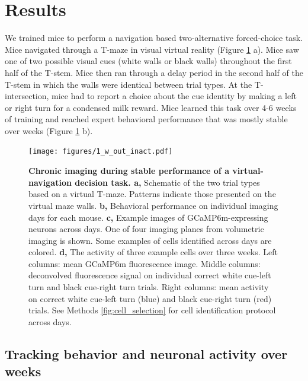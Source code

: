 \section{Results} \label{sec:chap3_results}

We trained mice to perform a navigation based two-alternative forced-choice task. Mice navigated through a T-maze in visual virtual reality  \citep{Harvey:2012du} (Figure \ref{fig:1_w_out_inact} a). Mice saw one of two possible visual cues (white walls or black walls) throughout the first half of the T-stem. Mice then ran through a delay period in the second half of the T-stem in which the walls were identical between trial types. At the T-intersection, mice had to report a choice about the cue identity by making a left or right turn for a condensed milk reward. Mice learned this task over 4-6 weeks of training and reached expert behavioral performance that was mostly stable over weeks (Figure \ref{fig:1_w_out_inact} b). 

\begin{figure}
\texttt{[image: figures/1\_w\_out\_inact.pdf]}
\caption[Chronic imaging during stable performance of a virtual-navigation decision task.]{\textbf{Chronic imaging during stable performance of a virtual-navigation decision task. a,} Schematic of the two trial types based on a virtual T-maze. Patterns indicate those presented on the virtual maze walls.
%
\textbf{b,} Behavioral performance on individual imaging days for each mouse. 
%
\textbf{c,} Example images of GCaMP6m-expressing neurons across days. One of four imaging planes from volumetric imaging is shown. Some examples of cells identified across days are colored. 
%
\textbf{d,} The activity of three example cells over three weeks. Left columns: mean GCaMP6m fluorescence image. Middle columns: deconvolved fluorescence signal on individual correct white cue-left turn and black cue-right turn trials. Right columns: mean activity on correct white cue-left turn (blue) and black cue-right turn (red) trials. See Methods \ref{fig:cell_selection} for cell identification protocol across days. 
\label{fig:1_w_out_inact}}
\end{figure}

\subsection{Tracking behavior and neuronal activity over weeks} \label{sec:chap3_track_neuron_behavior}

